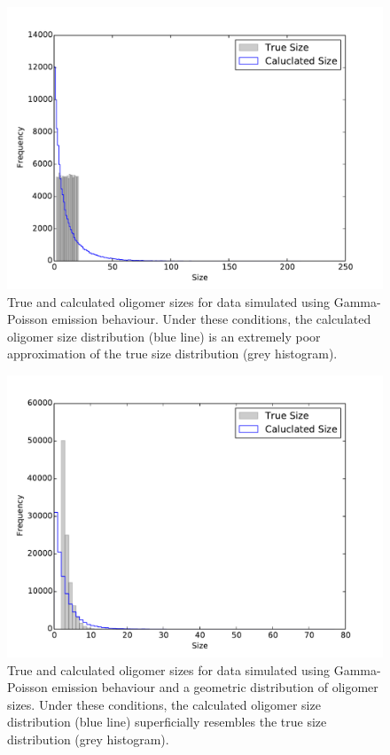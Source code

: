\begin{figure}
   \begin{center}
      \includegraphics*[clip=true, width=6in]{sizing/True_vs_Measured_oligomer_events_uniform_100000_hist.pdf}
      \caption{True and calculated oligomer sizes for data simulated using Gamma-Poisson emission behaviour. Under these conditions, the calculated oligomer size distribution (blue line) is an extremely poor approximation of the true size distribution (grey histogram).}
      \label{fig:gamma_Poisson_size_photons_uniform}
   \end{center}
\end{figure}

\begin{figure}
   \begin{center}
      \includegraphics*[clip=true, width=6in]{sizing/True_vs_Measured_oligomer_events_geometric_100000.pdf}
      \caption{True and calculated oligomer sizes for data simulated using Gamma-Poisson emission behaviour and a geometric distribution of oligomer sizes. Under these conditions, the calculated oligomer size distribution (blue line) superficially resembles the true size distribution (grey histogram).}
      \label{fig:gamma_Poisson_size_photons_geometric}
   \end{center}
\end{figure}

